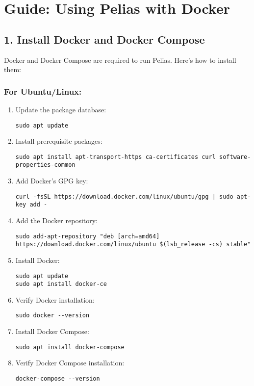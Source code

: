 \documentclass{article}
\begin{document}
\section*{Guide: Using Pelias with Docker}

\subsection*{1. Install Docker and Docker Compose}
Docker and Docker Compose are required to run Pelias. Here's how to install them:

\subsubsection*{For Ubuntu/Linux:}
\begin{enumerate}
    \item Update the package database:
    \begin{lstlisting}
sudo apt update
    \end{lstlisting}
    \item Install prerequisite packages:
    \begin{lstlisting}
sudo apt install apt-transport-https ca-certificates curl software-properties-common
    \end{lstlisting}
    \item Add Docker's GPG key:
    \begin{lstlisting}
curl -fsSL https://download.docker.com/linux/ubuntu/gpg | sudo apt-key add -
    \end{lstlisting}
    \item Add the Docker repository:
    \begin{lstlisting}
sudo add-apt-repository "deb [arch=amd64] https://download.docker.com/linux/ubuntu $(lsb_release -cs) stable"
    \end{lstlisting}
    \item Install Docker:
    \begin{lstlisting}
sudo apt update
sudo apt install docker-ce
    \end{lstlisting}
    \item Verify Docker installation:
    \begin{lstlisting}
sudo docker --version
    \end{lstlisting}
    \item Install Docker Compose:
    \begin{lstlisting}
sudo apt install docker-compose
    \end{lstlisting}
    \item Verify Docker Compose installation:
    \begin{lstlisting}
docker-compose --version
    \end{lstlisting}
\end{enumerate}
\end{document}
